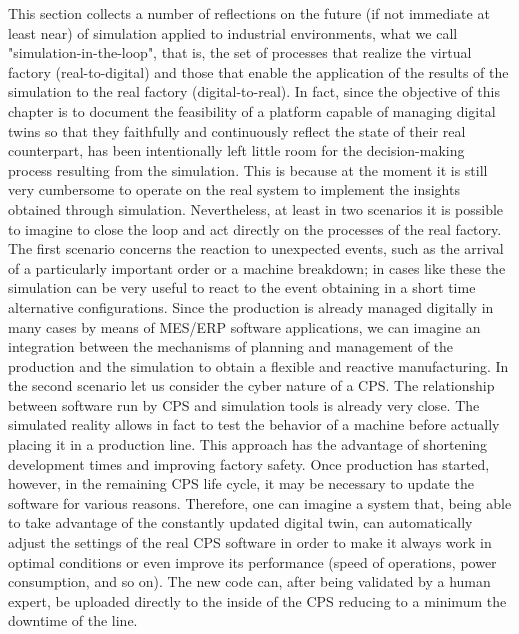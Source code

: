 This section collects a number of reflections on the future (if not immediate at least near) of simulation applied to industrial environments, what we call "simulation-in-the-loop", that is, the set of processes that realize the virtual factory (real-to-digital) and those that enable the application of the results of the simulation to the real factory (digital-to-real). 
In fact, since the objective of this chapter is to document the feasibility of a platform capable of managing digital twins so that they faithfully and continuously reflect the state of their real counterpart, has been intentionally left little room for the decision-making process resulting from the simulation. 
This is because at the moment it is still very cumbersome to operate on the real system to implement the insights obtained through simulation. 
Nevertheless, at least in two scenarios it is possible to imagine to close the loop and act directly on the processes of the real factory. 
The first scenario concerns the reaction to unexpected events, such as the arrival of a particularly important order or a machine breakdown; in cases like these the simulation can be very useful to react to the event obtaining in a short time alternative configurations. Since the production is already managed digitally in many cases by means of MES/ERP software applications, we can imagine an integration between the mechanisms of planning and management of the production and the simulation to obtain a flexible and reactive manufacturing. 
In the second scenario let us consider the cyber nature of a CPS. The relationship between software run by CPS and simulation tools is already very close. The simulated reality allows in fact to test the behavior of a machine before actually placing it in a production line. This approach has the advantage of shortening development times and improving factory safety. Once production has started, however, in the remaining CPS life cycle, it may be necessary to update the software for various reasons. Therefore, one can imagine a system that, being able to take advantage of the constantly updated digital twin, can automatically adjust the settings of the real CPS software in order to make it always work in optimal conditions or even improve its performance (speed of operations, power consumption, and so on). The new code can, after being validated by a human expert, be uploaded directly to the inside of the CPS reducing to a minimum the downtime of the line. 
